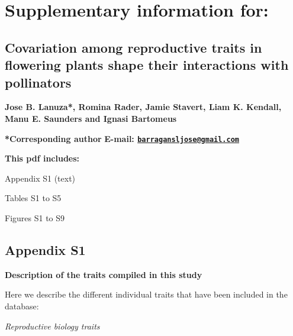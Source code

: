 \documentclass[
  12pt,
]{article}
\author{}
\date{\vspace{-2.5em}}
\begin{document}
\captionsetup[figure]{labelformat=empty}
\captionsetup[table]{labelformat=empty}

\singlespacing

\vspace{2cm}

\hypertarget{supplementary-information-for}{%
\section{Supplementary information
for:}\label{supplementary-information-for}}

\hypertarget{covariation-among-reproductive-traits-in-flowering-plants-shape-their-interactions-with-pollinators}{%
\subsection{Covariation among reproductive traits in flowering plants
shape their interactions with
pollinators}\label{covariation-among-reproductive-traits-in-flowering-plants-shape-their-interactions-with-pollinators}}

\textbf{Jose B. Lanuza*, Romina Rader, Jamie Stavert, Liam K. Kendall, Manu E. Saunders and Ignasi Bartomeus}

\textbf{*Corresponding author} \textbf{E-mail:
\href{mailto:barragansljose@gmail.com}{\nolinkurl{barragansljose@gmail.com}}}

\textbf{This pdf includes:}

Appendix S1 (text)

Tables S1 to S5

Figures S1 to S9

\doublespacing

\newpage

\hypertarget{appendix-s1}{%
\subsection{Appendix S1}\label{appendix-s1}}

\textbf{Description of the traits compiled in this study}

Here we describe the different individual traits that have been included
in the database:

\emph{Reproductive biology traits}
\end{document}

